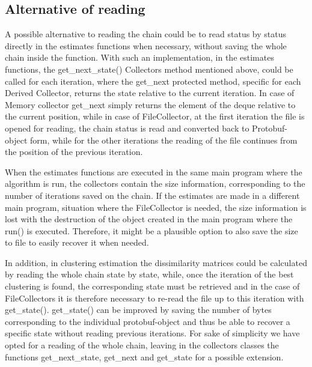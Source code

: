 \subsection{Alternative of reading}

A possible alternative to reading the chain could be to read status by status directly in the estimates functions when necessary, without saving the whole chain inside the function. 
With such an implementation, in the estimates functions, the get\_next\_state() Collectors method mentioned above, could be called for each iteration, where the get\_next protected method, specific for each Derived Collector, returns the state relative to the current iteration. 
In case of Memory collector get\_next simply returns the element of the deque relative to the current position, while in case of FileCollector, at the first iteration the file is opened for reading, the chain status is read and converted back to Protobuf-object form, while for the other iterations the reading of the file continues from the position of the previous iteration.

When the estimates functions are executed in the same main program where the algorithm is run, the collectors contain the size information, corresponding to the number of iterations saved on the chain. 
If the estimates are made in a different main program, situation where the FileCollector is needed, the size information is lost with the destruction of the object created in the main program where the run() is executed. Therefore, it might be a plausible option to also save the size to file to easily recover it when needed. 

In addition, in clustering estimation the dissimilarity matrices could be calculated by reading the whole chain state by state, while, once the iteration of the best clustering is found, the corresponding state must be retrieved and in the case of FileCollectors it is therefore necessary to re-read the file up to this iteration with get\_state(). get\_state() can be improved by saving the number of bytes corresponding to the individual protobuf-object and thus be able to recover a specific state without reading previous iterations. For sake of simplicity we have opted for a reading of the whole chain, leaving in the collectors classes the functions get\_next\_state, get\_next and get\_state for a possible extension.